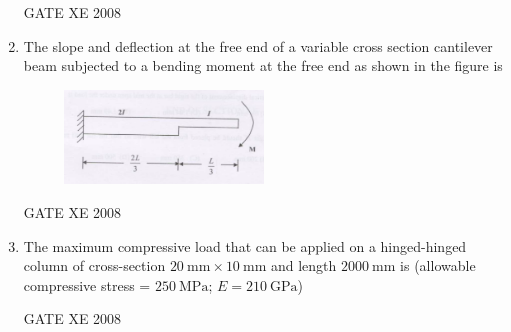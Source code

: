 \documentclass[12pt]{article}
\begin{document}
\begin{enumerate}[label=Q\arabic*.]
    GATE XE 2008  
    
    \item The slope and deflection at the free end of a variable cross section cantilever beam subjected to a bending moment at the free end as shown in the figure is  

    \begin{figure}[H]
    \centering
    \includegraphics[width=0.5\textwidth]{figs/ass1_d_q26.png}
    \caption{}
    \end{figure}

\begin{enumerate}[label=(\Alph*)]
\end{enumerate}
    
    GATE XE 2008  
    
    \item The maximum compressive load that can be applied on a hinged-hinged column of cross-section $20\ \mathrm{mm} \times 10\ \mathrm{mm}$ and length $2000\ \mathrm{mm}$ is (allowable compressive stress = $250\ \mathrm{MPa}$; $E = 210\ \mathrm{GPa}$)  

\begin{enumerate}[label=(\Alph*)]
\end{enumerate}
    
    GATE XE 2008  
    

\end{enumerate}
\end{document}
